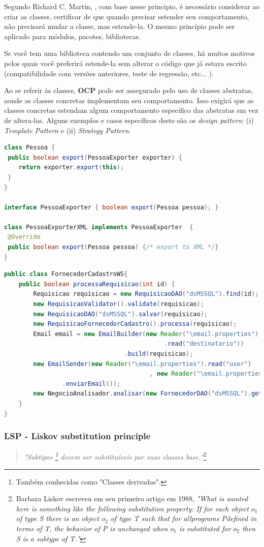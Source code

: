 \documentclass[12pt]{article}
\begin{document}
Segundo Richard C. Martin, \cite{ROBERT_MARTIN_THE_CLEAN_ARCHITECTURE}, com base nesse principio, é necessário considerar ao criar as classes, certificar de que quando precisar estender seu comportamento, não precisará mudar a classe, mas estende-la. O mesmo princípio pode ser aplicado para módulos, pacotes, bibliotecas.

Se você tem uma biblioteca contendo um conjunto de classes, há muitos motivos pelos quais você preferirá estende-la sem alterar o código que já estava escrito (compatibilidade com versões anteriores, teste de regressão, etc... ). 

Ao se referir às classes, \textbf{OCP} pode ser assegurado pelo uso de classes abstratas, aonde as classes concretas implementam seu comportamento. Isso exigirá que as classes concretas estendam algum comportamento especifico das abstratas em vez de altera-las. Alguns exemplos e casos específicos deste são os \textit{design pattern}: (i) \textit{Template Pattern} e (ii) \textit{Strategy Pattern}.

\begin{lstlisting}[caption=Exemplo em conformidade ao OCP,language=java]
class Pessoa {
 public boolean export(PessoaExporter exporter) {
	return exporter.export(this);
 }
}
 
interface PessoaExporter { boolean export(Pessoa pessoa); }

class PessoaExporterXML implements PessoaExporter  {
 @Override
 public boolean export(Pessoa pessoa) {/* export to XML */}
} 
\end{lstlisting}

\begin{lstlisting}[caption=Exemplo de violação ao OCP,language=java]
public class FornecedorCadastroWS{
	public boolean processaRequisicao(int id) {
		Requisicao requisicao = new RequisicaoDAO("dsMSSQL").find(id);
		new RequisicaoValidator().validate(requisicao);
		new RequisicaoDAO("dsMSSQL").salvar(requisicao);
		new RequisicaoFornecedorCadastro().processa(requisicao);
		Email email = new EmailBuilder(new Reader("\email.properties")
											.read("destinatario"))
								 .build(requisicao);
		new EmailSender(new Reader("\email.properties").read("user")
										, new Reader("\email.properties").read("pwd")
				.enviarEmail());
		new NegocioAnalisador.analisar(new FornecedorDAO("dsMSSQL").get(requisicao));
	}
}
\end{lstlisting}

\subsubsection{LSP - Liskov substitution principle}
\begin{quote}
	\textit{"Subtipos \footnote{Também conhecidas como "Classes derivadas".} devem ser substituíveis por suas classes base."}\footnote{Barbara Liskov escreveu em seu primeiro artigo em 1988, \textit{"What is wanted here is something like the following substitution property: If for each object $ o_1 $ of type S there is an object $ o_2 $ of type T such that for allprograms Pdefined in terms of T, the behavior of P is unchanged when $ o_1 $ is substituted for $ o_2 $ then S is a subtype of T."} }	
\end{quote}
\end{document}
